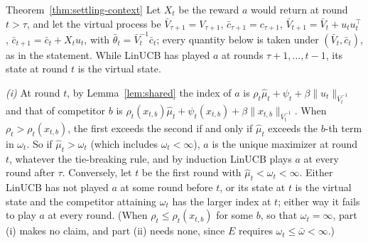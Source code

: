 \documentclass[anon]{alt2027} %
\begin{document}
\begin{proofof}{Theorem~\ref{thm:settling-context}}
Let $X_t$ be the reward $a$ would return at round $t>\tau$, and let the
virtual process be $\bar V_{\tau+1}=V_{\tau+1}$, $\bar c_{\tau+1}=c_{\tau+1}$,
$\bar V_{t+1}=\bar V_t+u_tu_t^\top$, $\bar c_{t+1}=\bar c_t+X_tu_t$, with
$\bar\theta_t=\bar V_t^{-1}\bar c_t$; every quantity below is taken under
$(\bar V_t,\bar c_t)$, as in the statement. While LinUCB has played $a$ at
rounds $\tau+1,\dots,t-1$, its state at round $t$ is the virtual state.

\emph{(i)} At round $t$, by Lemma~\ref{lem:shared} the index of $a$ is
$\rho_t\widehat\mu_t+\psi_t+\beta\|u_t\|_{\bar V_t^{-1}}$ and that of
competitor $b$ is
$\rho_t(x_{t,b})\widehat\mu_t+\psi_t(x_{t,b})+\beta\|x_{t,b}\|_{\bar V_t^{-1}}$.
When $\rho_t>\rho_t(x_{t,b})$, the first exceeds the second if and only if
$\widehat\mu_t$ exceeds the $b$-th term in $\omega_t$. So if
$\widehat\mu_t>\omega_t$ (which includes $\omega_t<\infty$), $a$ is the
unique maximizer at round $t$, whatever the tie-breaking rule, and by
induction LinUCB plays $a$ at every round after $\tau$. Conversely, let $t$
be the first round with $\widehat\mu_t<\omega_t<\infty$. Either LinUCB has
not played $a$ at some round before $t$, or its state at $t$ is the virtual
state and the competitor attaining $\omega_t$ has the larger index at $t$;
either way it fails to play $a$ at every round. (When
$\rho_t\le\rho_t(x_{t,b})$ for some $b$, so that $\omega_t=\infty$, part (i)
makes no claim, and part (ii) needs none, since $E$ requires
$\omega_t\le\bar\omega<\infty$.)


\end{proofof}
\end{document}
